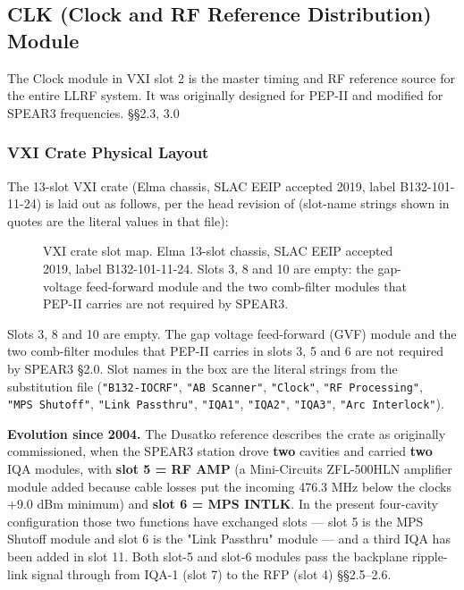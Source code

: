 \subsection{CLK (Clock and RF Reference Distribution) Module}

The Clock module in VXI slot 2 is the master timing and RF reference source for the entire LLRF system. It was originally designed for PEP-II and modified for SPEAR3 frequencies.  §§2.3, 3.0

\subsubsection{VXI Crate Physical Layout}

The 13-slot VXI crate (Elma chassis, SLAC EEIP accepted 2019, label B132-101-11-24) is laid out as follows, per the head revision of  (slot-name strings shown in quotes are the literal values in that file):

\begin{figure}[tbp]\centering
\begin{fitpicture}\end{fitpicture}
\caption{VXI crate slot map.  Elma 13-slot chassis, SLAC EEIP accepted 2019,
  label B132-101-11-24.  Slots 3, 8 and 10 are empty: the gap-voltage
  feed-forward module and the two comb-filter modules that PEP-II carries are
  not required by SPEAR3.}\label{fig:vxi-crate}
\end{figure}

Slots 3, 8 and 10 are empty. The gap voltage feed-forward (GVF) module and the two comb-filter modules that PEP-II carries in slots 3, 5 and 6 are not required by SPEAR3  §2.0. Slot names in the box are the literal strings from the substitution file (\texttt{"B132-IOCRF"}, \texttt{"AB\ Scanner"}, \texttt{"Clock"}, \texttt{"RF\ Processing"}, \texttt{"MPS\ Shutoff"}, \texttt{"Link\ Passthru"}, \texttt{"IQA1"}, \texttt{"IQA2"}, \texttt{"IQA3"}, \texttt{"Arc\ Interlock"}).

\textbf{Evolution since 2004.} The Dusatko reference  describes the crate as originally commissioned, when the SPEAR3 station drove \textbf{two} cavities and carried \textbf{two} IQA modules, with \textbf{slot 5 = RF AMP} (a Mini-Circuits ZFL-500HLN amplifier module added because cable losses put the incoming 476.3 MHz below the clock\textquotesingle s +9.0 dBm minimum) and \textbf{slot 6 = MPS INTLK}. In the present four-cavity configuration those two functions have exchanged slots --- slot 5 is the MPS Shutoff module and slot 6 is the "Link Passthru" module --- and a third IQA has been added in slot 11. Both slot-5 and slot-6 modules pass the backplane ripple-link signal through from IQA-1 (slot 7) to the RFP (slot 4)  §§2.5--2.6.

